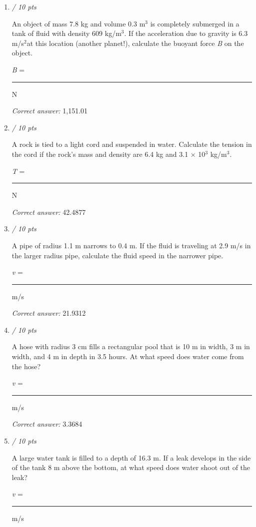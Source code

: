 \documentclass[11pt]{article}
\begin{document}
\begin{enumerate}[leftmargin=*,label=\textbf{Question \arabic*.}]
\textit{Correct answer: } 47.9912

\item \hfill \textit{/ 10 pts}

An object of mass 7.8 kg and volume 0.3 m$^{3}$ is completely submerged in a tank of fluid with density 609 kg/m$^{3}$. If the acceleration due to gravity is 6.3 m/s$^{2}$at this location (another planet!), calculate the buoyant force \emph{B} on the object.



\emph{B} = \rule{2cm}{0.4pt} N

\textit{Correct answer: } 1,151.01

\item \hfill \textit{/ 10 pts}

A rock is tied to a light cord and suspended in water. Calculate the tension in the cord if the rock's mass and density are 6.4 kg and 3.1 × 10$^{3}$ kg/m$^{3}$.



\emph{T } = \rule{2cm}{0.4pt} N

\textit{Correct answer: } 42.4877

\item \hfill \textit{/ 10 pts}

A pipe of radius 1.1 m narrows to 0.4 m. If the fluid is traveling at 2.9 m/s in the larger radius pipe, calculate the fluid speed in the narrower pipe.



\emph{v }= \rule{2cm}{0.4pt} m/s

\textit{Correct answer: } 21.9312

\item \hfill \textit{/ 10 pts}

A hose with radius 3 cm fills a rectangular pool that is 10 m in width, 3 m in width, and 4 m in depth in 3.5 hours. At what speed does water come from the hose?



\emph{v }= \rule{2cm}{0.4pt} m/s

\textit{Correct answer: } 3.3684

\item \hfill \textit{/ 10 pts}

A large water tank is filled to a depth of 16.3 m. If a leak develops in the side of the tank 8 m above the bottom, at what speed does water shoot out of the leak?



\emph{v }= \rule{2cm}{0.4pt} m/s


\end{enumerate}
\end{document}
